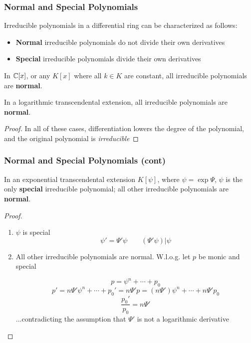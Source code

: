 \documentclass[aspectratio=169,dvipsnames]{beamer}
\begin{document}
\begin{frame}
\frametitle{Normal and Special Polynomials}

Irreducible polynomials in a differential ring can be characterized as follows:

\begin{itemize}
\item {\bf Normal} irreducible polynomials do not divide their own derivatives
\item {\bf Special} irreducible polynomials divide their own derivatives
\end{itemize}

In $\mathbb{C}[x]$, or any $K[x]$ where all $k\in K$ are constant, all irreducible polynomials are {\bf normal}.

\bigskip

In a logarithmic transcendental extension, all irreducible polynomials are {\bf normal}.

\begin{proof}
In all of these cases,
differentiation lowers the degree of the polynomial, and the original polynomial is {\it irreducible}
\end{proof}

\end{frame}

\begin{frame}
\frametitle{Normal and Special Polynomials (cont)}

In an exponential transcendental extension $K[\psi]$, where $\psi = \exp \Psi$, $\psi$ is the
only {\bf special} irreducible polynomial; all other irreducible polynomials are {\bf normal}.

\begin{proof}
\begin{enumerate}
\item $\psi$ is special
$$\psi' = \Psi' \psi \qquad \left(\Psi'\psi\right) | \psi$$
\item All other irreducible polynomials are normal.  W.l.o.g. let $p$ be monic and special

$$p = \psi^n + \cdots + p_0$$
$$p' = n \Psi' \psi^n + \cdots + p_0' = n \Psi' p = (n \Psi') \psi^n + \cdots + n \Psi' p_0$$
$$\frac{p_0'}{p_0} = n \Psi'$$
...contradicting the assumption that $\Psi'$ is not a logarithmic derivative
\end{enumerate}
\end{proof}

\end{frame}
\end{document}
